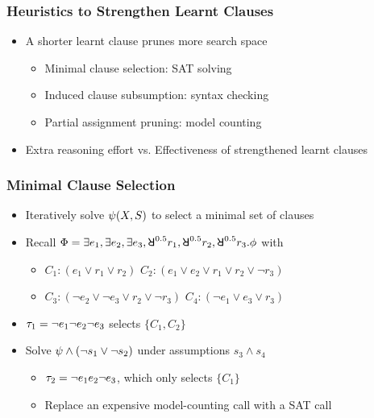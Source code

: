 \begin{frame}
    \frametitle{Heuristics to Strengthen Learnt Clauses}
    \begin{itemize}
        \item A shorter learnt clause prunes more search space
              \begin{itemize}
                  \item Minimal clause selection: SAT solving
                  \item Induced clause subsumption: syntax checking
                  \item Partial assignment pruning: model counting
              \end{itemize}
              \pause
        \item Extra reasoning effort vs. Effectiveness of strengthened learnt clauses
    \end{itemize}
\end{frame}

\begin{frame}
    \frametitle{Minimal Clause Selection}
    \begin{itemize}
        \item Iteratively solve $\psi(X,S)$ to select a minimal set of clauses
              \pause
        \item Recall $\Qf=\exists e_1,\exists e_2,\exists e_3,\random{0.5} r_1,\random{0.5} r_2,\random{0.5} r_3.\pf$ with
              \begin{itemize}
                  \item[] $C_1: (e_1 \lor r_1 \lor r_2)$ $C_2: (e_1 \lor e_2 \lor r_1 \lor r_2 \lor \lnot r_3)$
                  \item[] $C_3: (\lnot e_2 \lor \lnot e_3 \lor r_2 \lor \lnot r_3)$ $C_4: (\lnot e_1 \lor e_3 \lor r_3)$
              \end{itemize}
              \pause
        \item $\tau_1=\lnot e_1 \lnot e_2 \lnot e_3$ selects $\{C_1,C_2\}$
              \pause
        \item Solve $\psi\land(\lnot s_1\lor\lnot s_2)$ under assumptions $s_3\land s_4$
              \begin{itemize}
                  \item $\tau_2=\lnot e_1 e_2 \lnot e_3$, which only selects $\{C_1\}$
                  \item Replace an expensive model-counting call with a SAT call
              \end{itemize}
    \end{itemize}
\end{frame}

